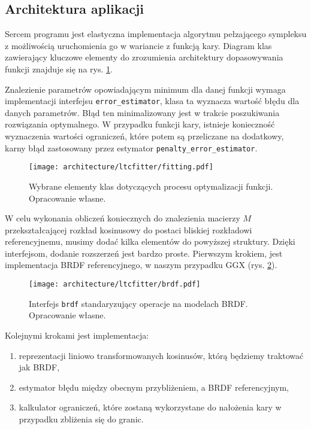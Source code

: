 \documentclass[../main.tex]{subfiles}
\newcommand{\graphvizscale}{0.09}
\begin{document}
\subsection{Architektura aplikacji}

Sercem programu jest elastyczna implementacja algorytmu pełzającego sympleksu z możliwością uruchomienia go w wariancie z funkcją kary. Diagram klas zawierający kluczowe elementy do zrozumienia architektury dopasowywania funkcji znajduje się na rys. \ref{fig:FunctionSolveClassDiagram}. 

Znalezienie parametrów opowiadającym minimum dla danej funkcji wymaga implementacji interfejsu \texttt{error\_estimator}, klasa ta wyznacza wartość błędu dla danych parametrów. Błąd ten minimalizowany jest w trakcie poszukiwania rozwiązania optymalnego. W przypadku funkcji kary, istnieje konieczność wyznaczenia wartości ograniczeń, które potem są przeliczane na dodatkowy, karny błąd zastosowany przez estymator \texttt{penalty\_error\_estimator}. 

\begin{figure}[h]
    \centering
    \texttt{[image: architecture/ltcfitter/fitting.pdf]}
    \caption{Wybrane elementy klas dotyczących procesu optymalizacji funkcji. Opracowanie własne.}
    \label{fig:FunctionSolveClassDiagram}
\end{figure}

W celu wykonania obliczeń koniecznych do znalezienia macierzy $M$ przekształcającej rozkład kosinusowy do postaci bliskiej rozkładowi referencyjnemu, musimy dodać kilka elementów do powyższej struktury. Dzięki interfejsom, dodanie rozszerzeń jest bardzo proste. Pierwszym krokiem, jest implementacja BRDF referencyjnego, w naszym przypadku GGX (rys. \ref{fig:BRDFClassDiagram}).

\begin{figure}[h]
    \centering
    \texttt{[image: architecture/ltcfitter/brdf.pdf]}
    \caption{Interfejs \texttt{brdf} standaryzujący operacje na modelach BRDF. Opracowanie własne.}
    \label{fig:BRDFClassDiagram}
\end{figure}

Kolejnymi krokami jest implementacja: 
\begin{enumerate}
    \item reprezentacji liniowo transformowanych kosinusów, którą będziemy traktować jak BRDF,
    \item estymator błędu między obecnym przybliżeniem, a BRDF referencyjnym,
    \item kalkulator ograniczeń, które zostaną wykorzystane do nałożenia kary w przypadku zbliżenia się do granic.
\end{enumerate}
\end{document}
